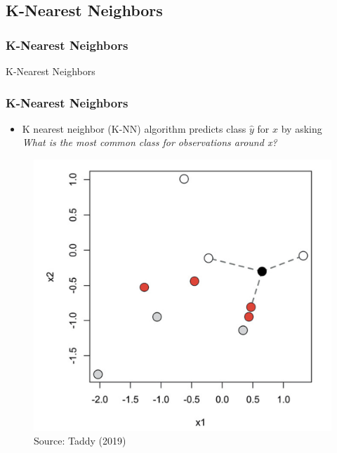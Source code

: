 \documentclass[
  shownotes,
  xcolor={svgnames},
  hyperref={colorlinks,citecolor=DarkBlue,linkcolor=DarkRed,urlcolor=DarkBlue}
  , aspectratio=169]{beamer}
\begin{document}
\subsection{K-Nearest Neighbors}
\begin{frame}[fragile]
\frametitle{K-Nearest Neighbors}


\centering
{\huge \textcolor{andesred}{K-Nearest Neighbors}}



\end{frame}
\begin{frame}[fragile]
\frametitle{K-Nearest Neighbors}

\begin{itemize}
\item K nearest neighbor (K-NN) algorithm predicts class $\hat y$ for $x$ by asking \\
{\it What is the most common class for observations around x?}
\end{itemize}
        \begin{figure}[H] \centering
            \captionsetup{justification=centering}
              \includegraphics[scale=0.13]{figures/knn}
              \\
              \tiny
              Source: Taddy (2019)
 \end{figure}

 \end{frame}
\end{document}
